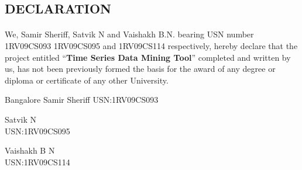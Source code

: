 \documentclass[12pt]{report}
\begin{document}
\begin{titlepage}
\begin{center}
\section*{DECLARATION}
\end{center}

\paragraph{}  We, Samir Sheriff, Satvik N and Vaishakh B.N. bearing USN number 1RV09CS093 1RV09CS095 and 1RV09CS114 respectively, hereby declare that the project entitled ``\textbf{Time Series Data Mining Tool}'' completed and written by us, has not been previously formed the basis for the award of any degree or diploma or certificate of any other University.
\vspace{1in}

\begin{flushright} {Bangalore \hspace{4.4in} Samir Sheriff } 
 {USN:1RV09CS093}
 \end{flushright}

\begin{flushright} { Satvik N } \\
 {USN:1RV09CS095}
 \end{flushright}

\begin{flushright} { Vaishakh B N } \\
 {USN:1RV09CS114}
 \end{flushright}

\end{titlepage}
\end{document}
